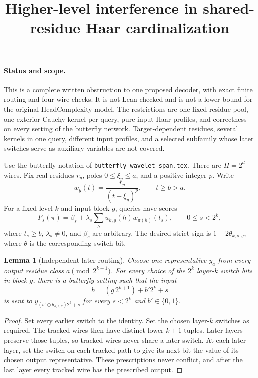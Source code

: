 \documentclass[11pt]{article}
\newtheorem{lemma}{Lemma}
\begin{document}
\title{Higher-level interference in shared-residue Haar cardinalization}
\author{}
\date{}
\maketitle

\paragraph{Status and scope.}
This is a complete written obstruction to one proposed decoder, with exact
finite routing and four-wire checks. It is not Lean checked and is not a
lower bound for the original HeadComplexity model. The restrictions are
one fixed residue pool, one exterior Cauchy kernel per query, pure input
Haar profiles, and correctness on every setting of the butterfly network.
Target-dependent residues, several kernels in one query, different input
profiles, and a selected subfamily whose later switches serve as auxiliary
variables are not covered.

Use the butterfly notation of \texttt{butterfly-wavelet-span.tex}.
There are $H=2^d$ wires. Fix real residues $r_y$, poles
$0\leq\xi_y\leq a$, and a positive integer $p$. Write
\[
 w_y(t)=\frac{r_y}{(t-\xi_y)^p},\qquad t\geq b>a.
\]
For a fixed level $k$ and input block $g$, queries have scores
\[
 F_s(\pi)=\beta_s+\lambda_s\sum_h u_{k,g}(h)w_{\pi(h)}(t_s),
 \qquad 0\leq s<2^k,
\]
where $t_s\geq b$, $\lambda_s\ne0$, and $\beta_s$ are arbitrary.
The desired strict sign is $1-2\theta_{k,s,g}$, where $\theta$ is the
corresponding switch bit.

\begin{lemma}[Independent later routing]
Choose one representative $y_a$ from every output residue class
$a\pmod {2^{k+1}}$. For every choice of the $2^k$ layer-$k$ switch bits
in block $g$, there is a butterfly setting such that the input
\[
 h=(g\,2^{k+1})+b'2^k+s
\]
is sent to $y_{(b'\mathbin{\oplus}\theta_{k,s,g})2^k+s}$ for every
$s<2^k$ and $b'\in\{0,1\}$.
\end{lemma}
\begin{proof}
Set every earlier switch to the identity. Set the chosen layer-$k$
switches as required. The tracked wires then have distinct lower
$k+1$ tuples. Later layers preserve those tuples, so tracked wires
never share a later switch. At each later layer, set the switch on
each tracked path to give its next bit the value of its chosen output
representative. These prescriptions never conflict, and after the last
layer every tracked wire has the prescribed output.
\end{proof}
\end{document}
